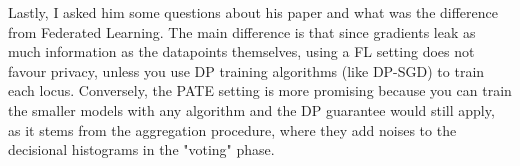Lastly, I asked him some questions about his paper \cite{papernot_unlearning_2020} and what was the difference from Federated Learning.
The main difference is that since gradients leak as much information as the datapoints themselves, using a FL setting does not favour privacy, unless you use DP training algorithms (like DP-SGD) to train each locus.
Conversely, the PATE setting is more promising because you can train the smaller models with any algorithm and the DP guarantee would still apply, as it stems from the aggregation procedure, where they add noises to the decisional histograms in the "voting" phase. 
